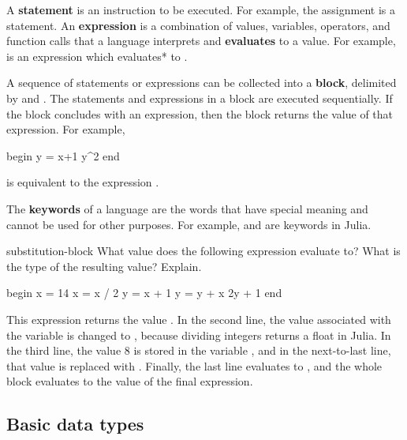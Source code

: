 \documentclass[prettycode,jlmin,shellescape]{watsonbook}
\begin{document}
A \textbf{statement} is an instruction to be executed. For
example, the assignment  is a statement.  An
\textbf{expression} is a combination of values, variables,
operators, and function calls that a language interprets and
\textbf{evaluates} to a value. For example,
 is an expression which
evaluates* 
to .

A sequence of statements or expressions can be collected into a
\textbf{block}, delimited by  and
. The statements and expressions in a block are
executed sequentially. If the block concludes with an expression,
then the block returns the value of that expression. For example,
\begin{juliablock}[title=]
  begin
      y = x+1
      y^2
  end
\end{juliablock}
is equivalent to the expression .

The \textbf{keywords} of a language are the words that have
special meaning and cannot be used for other purposes. For
example,  and  are keywords in
Julia.

\begin{exercise}{}{substitution-block}
  What value does the following expression evaluate to? What is the
  type of the resulting value? Explain. 
  \begin{juliablock}[title=]
    begin
        x = 14
        x = x / 2
        y = x + 1
        y = y + x
        2y + 1
    end
  \end{juliablock}
\end{exercise}

\begin{solution}
  This expression returns the  value
  . In the second line, the value associated with
  the variable  is changed to ,
  because dividing integers returns a float in Julia. In the third
  line, the value 8 is stored in the variable , and in
  the next-to-last line, that value is replaced with
  . Finally, the last line evaluates to
  , and the whole block evaluates to the value of
  the final expression. 
\end{solution}

\subsection{Basic data types}
\end{document}

